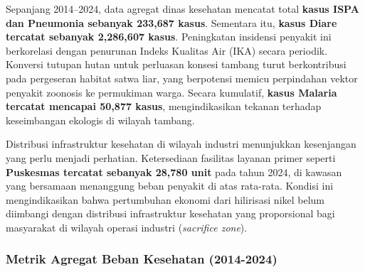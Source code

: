 \documentclass[
]{article}
\begin{document}
Sepanjang 2014--2024, data agregat dinas kesehatan mencatat total
\textbf{kasus ISPA dan Pneumonia sebanyak 233,687 kasus}. Sementara itu,
\textbf{kasus Diare tercatat sebanyak 2,286,607 kasus}. Peningkatan
insidensi penyakit ini berkorelasi dengan penurunan Indeks Kualitas Air
(IKA) secara periodik. Konversi tutupan hutan untuk perluasan konsesi
tambang turut berkontribusi pada pergeseran habitat satwa liar, yang
berpotensi memicu perpindahan vektor penyakit zoonosis ke permukiman
warga. Secara kumulatif, \textbf{kasus Malaria tercatat mencapai 50,877
kasus}, mengindikasikan tekanan terhadap keseimbangan ekologis di
wilayah tambang.

Distribusi infrastruktur kesehatan di wilayah industri menunjukkan
kesenjangan yang perlu menjadi perhatian. Ketersediaan fasilitas layanan
primer seperti \textbf{Puskesmas tercatat sebanyak 28,780 unit} pada
tahun 2024, di kawasan yang bersamaan menanggung beban penyakit di atas
rata-rata. Kondisi ini mengindikasikan bahwa pertumbuhan ekonomi dari
hilirisasi nikel belum diimbangi dengan distribusi infrastruktur
kesehatan yang proporsional bagi masyarakat di wilayah operasi industri
(\emph{sacrifice zone}).

\subsubsection{Metrik Agregat Beban Kesehatan
(2014-2024)}\label{metrik-agregat-beban-kesehatan-2014-2024}
\end{document}
